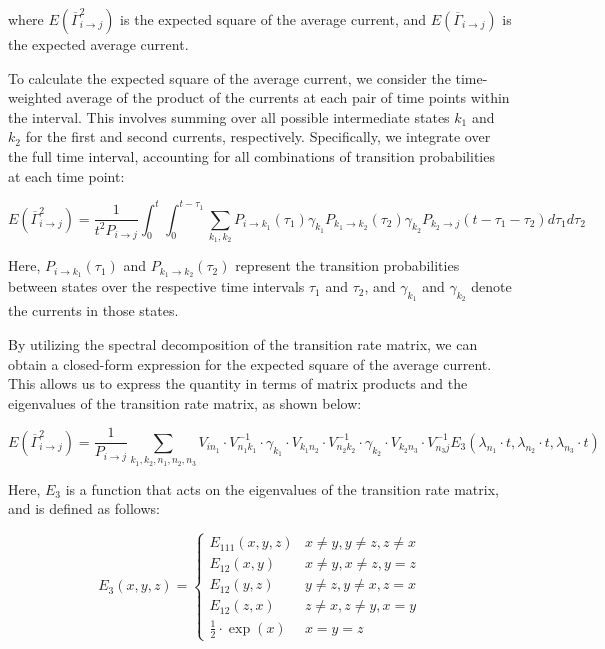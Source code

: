 \documentclass[pdflatex,sn-mathphys-num]{sn-jnl}%
\theoremstyle{thmstyleone}%
\theoremstyle{thmstyletwo}%
\theoremstyle{thmstylethree}%
\begin{document}
where \( E(\overline{\Gamma}_{i \rightarrow j}^2) \) is the expected square of the average current, and \( E(\overline{\Gamma}_{i \rightarrow j}) \) is the expected average current.


To calculate the expected square of the average current, we consider the time-weighted average of the product of the currents at each pair of time points within the interval. This involves summing over all possible intermediate states \(k_1\) and \(k_2\) for the first and second currents, respectively. Specifically, we integrate over the full time interval, accounting for all combinations of transition probabilities at each time point:

\begin{equation}
	E(\overline{\Gamma}_{i \rightarrow j}^2) = \frac{1}{t^2 P_{i \rightarrow j}} \int_0^t \int_0^{t-\tau_1} \sum_{k_1, k_2} P_{i \rightarrow k_1}(\tau_1) \gamma_{k_1} P_{k_1 \rightarrow k_2}(\tau_2) \gamma_{k_2} P_{k_2 \rightarrow j}(t-\tau_1-\tau_2) d\tau_1 d\tau_2
    \label{eq:sqr_gamma_integral}
\end{equation}

Here, \(P_{i \rightarrow k_1}(\tau_1)\) and \(P_{k_1 \rightarrow k_2}(\tau_2)\) represent the transition probabilities between states over the respective time intervals \(\tau_1\) and \(\tau_2\), and \(\gamma_{k_1}\) and \(\gamma_{k_2}\) denote the currents in those states.


By utilizing the spectral decomposition of the transition rate matrix, we can obtain a closed-form expression for the expected square of the average current. This allows us to express the quantity in terms of matrix products and the eigenvalues of the transition rate matrix, as shown below:

\begin{equation}
	E(\overline{\Gamma}_{i \rightarrow j}^2) = \frac{1}{P_{i \rightarrow j}} \sum_{k_1, k_2, n_1, n_2, n_3} V_{i n_1} \cdot V^{-1}_{n_1 k_1} \cdot \gamma_{k_1} \cdot V_{k_1 n_2} \cdot V^{-1}_{n_2 k_2} \cdot \gamma_{k_2} \cdot V_{k_2 n_3} \cdot V^{-1}_{n_3 j} E_3(\lambda_{n_1} \cdot t, \lambda_{n_2} \cdot t, \lambda_{n_3} \cdot t)
    \label{eq:sqr_gamma_formula}
\end{equation}

Here, \(E_3\) is a function that acts on the eigenvalues of the transition rate matrix, and is defined as follows:

\begin{equation}
	E_3(x,y,z)= 
	\begin{cases}
		E_{111}(x,y,z) & x\neq y, y\neq z, z\neq x \\
		E_{12}(x,y) & x\neq y, x\neq z, y = z \\
		E_{12}(y,z) & y\neq z, y\neq x, z = x \\
		E_{12}(z,x) & z\neq x, z\neq y, x = y \\
		\frac{1}{2} \cdot \exp(x) & x=y=z
	\end{cases}
	\label{eq:E_3}
\end{equation}
\end{document}
